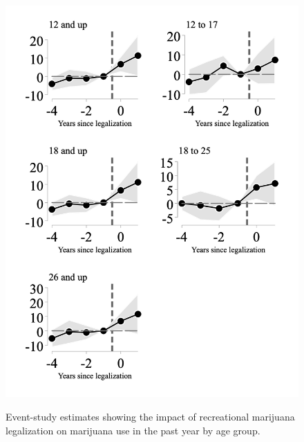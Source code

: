 \documentclass[12pt]{article}%
\begin{document}
\begin{figure}[h]
    \caption{Event-study estimates showing the impact of recreational marijuana legalization on marijuana use in the past year by age group.}
    \includegraphics[width=.75\linewidth]{../output/plots/figure_2.png}
    \label{fig:leads-and-lags-mj-past-year}
\end{figure}
\end{document}
